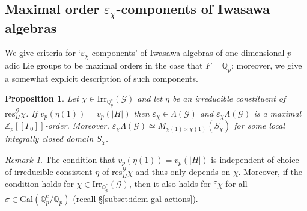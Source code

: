 \documentclass[12pt]{amsart}
\theoremstyle{plain}
\newtheorem{prop}[theorem]{Proposition}
\theoremstyle{remark}
\newtheorem{remark}[theorem]{Remark}
\theoremstyle{definition}
\numberwithin{equation}{section}
\begin{document}
\subsection{Maximal order $\varepsilon_{\chi}$-components of Iwasawa algebras}
We give criteria for `$\varepsilon_{\chi}$-components' of Iwasawa algebras of one-dimensional $p$-adic Lie groups to be maximal orders in the case that $F={\mathbb{Q}}_{p}$;
moreover, we give a somewhat explicit description of such components.

\begin{prop}\label{prop:max-part-of-hybrid-matrix-over-comm-ring}
Let $\chi \in {\mathrm{Irr}}_{{\mathbb{Q}}_{p}^{c}}(\mathcal{G})$ and let $\eta$ be an irreducible constituent of
${\mathrm{res}}^{\mathcal{G}}_{H} \chi$.
If $v_{p}(\eta(1))=v_{p}(|H|)$ then $\varepsilon_{\chi} \in \Lambda(\mathcal{G})$ and $\varepsilon_{\chi}\Lambda(\mathcal{G})$
is a maximal ${\mathbb{Z}}_{p}[[\Gamma_{0}]]$-order.
Moreover, $\varepsilon_{\chi}\Lambda(\mathcal{G}) \simeq M_{\chi(1) \times \chi(1)}(S_{\chi})$
for some local integrally closed domain $S_{\chi}$.
\end{prop}

\begin{remark}
The condition that $v_{p}(\eta(1))=v_{p}(|H|)$ is independent of choice of irreducible consistent $\eta$ of ${\mathrm{res}}^{\mathcal{G}}_{H} \chi$
and thus only depends on $\chi$. Moreover, if the condition holds for $\chi \in {\mathrm{Irr}}_{{\mathbb{Q}}_{p}^{c}}(\mathcal{G})$, then
it also holds for ${}^{\sigma}\chi$ for all $\sigma \in {\mathrm{Gal}}({\mathbb{Q}}_{p}^{c}/{\mathbb{Q}}_{p})$ (recall \S \ref{subset:idem-gal-actions}).
\end{remark}
\end{document}
